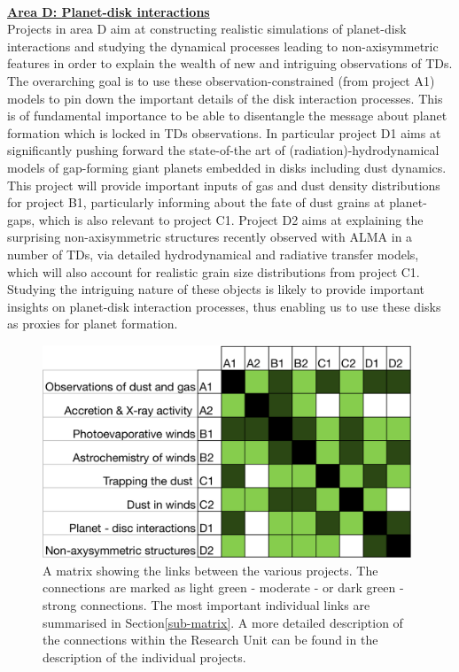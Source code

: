 \documentclass[10pt,fleqn,twoside,a4paper]{article}
\newcommand{\AreacolD}{\color{Red}}
\begin{document}
\mbox{}\vspace{1em}\\
\noindent\underline{\bf\AreacolD Area D: Planet-disk interactions}\\
\noindent Projects in area D aim at constructing realistic
simulations of planet-disk interactions and studying the dynamical processes
leading to non-axisymmetric features in order to explain the wealth of new
and intriguing observations of TDs. The overarching goal is to use
these observation-constrained (from project A1) models to pin down
the important details of the disk interaction processes. This is of
fundamental importance to be able to disentangle the message about
planet formation which is locked in TDs observations. In particular
project D1 aims at significantly pushing forward the state-of-the art
of (radiation)-hydrodynamical models of gap-forming giant planets
embedded in disks including dust dynamics. 
This project will provide important inputs of
gas and dust density distributions for project B1, particularly informing about the
fate of dust grains at planet-gaps, which is also relevant to project
C1. Project D2 aims at explaining the surprising non-axisymmetric
structures recently observed with ALMA in a number of TDs, via
detailed hydrodynamical and radiative transfer models, which will also
account for realistic grain size distributions from project
C1. Studying the intriguing nature of these objects is likely to
provide important insights on planet-disk interaction processes, thus
enabling us to use these disks as proxies for planet formation.  \\ 


\begin{figure}
\centerline{\includegraphics[width=11cm]{figures/matrix.pdf}}
\caption{\label{fig-matrix} A matrix showing the links between the various
projects. The connections are marked as light green - moderate - or
dark green - strong connections. The most important individual links
are summarised in  Section\ref{sub-matrix}.  A more detailed
description of the connections within the 
Research Unit can be found in the description of the individual
projects.  }
\end{figure}
\end{document}
